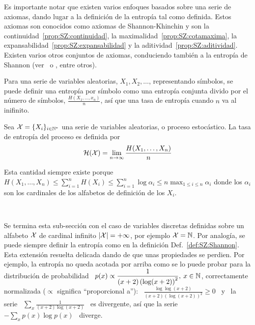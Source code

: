 Es  importante notar  que existen  varios enfoques  basados sobre  una  serie de
axiomas, dando lugar a la definici\'on de la entrop\'ia tal como definida. Estos
axiomas   son   conocidos   como   axiomas   de  Shannon-Khinchin   y   son   la
continuidad~\ref{prop:SZ:continuidad},  la maximalidad~\ref{prop:SZ:cotamaxima},
la           expansabilidad~\ref{prop:SZ:expansabilidad}           y          la
aditividad~\ref{prop:SZ:aditividad}.  Existen varios otros conjuntos de axiomas,
conduciendo  tambi\'en a  la entrop\'ia  de Shannon  (ver~\cite[Sec.~6]{Sha48} o
\cite{ShaWea64, Fad56, Fad58, Khi57, Ren61}, entre otros).

Para  una  serie de  variables  aleatorias,  $X_1,  X_2, \ldots$,  representando
s\'imbolos, se  puede definir una  entrop\'ia por s\'imbolo como  una entrop\'ia
conjunta  divido por el  n\'umero de  s\'imbolos, $\frac{H(X_1,\ldots,x_n)}{n}$,
as\'i que una tasa de entrop\'ia cuando $n$ va al inifinito.
%
\begin{definicion}\label{def:SZ:TasaDeEntropia}
  Sea $\mathcal{X}  = \{  X_i \}_{i \in  \mathbb{N}^*}$ una  serie de variables  aleatorias, o
  proceso estoc\'astico.  La tasa de entrop\'ia del proceso es definida por
  \[
  \mathcal{H}(\mathcal{X}) = \lim_{n \to \infty} \frac{H(X_1,\ldots,X_n)}{n}
  \]
\end{definicion}
%
\noindent Esta  cantidad siempre existe  porque $\displaystyle H(X_1 ,  \ldots ,
X_n) \le \sum_{i=1}^n H(X_i) \le \sum_{i=1}^n  \log \alpha_i \le n \max_{1 \le i
  \le n} \alpha_i$  donde los $\alpha_i$ son los cardinales  de los alfabetos de
definici\'on de los $X_i$.

\

Se termina esta sub-secci\'on con el caso de variables discretas definidas sobre
un  alfabeto $\mathcal{X}$ de  cardinal infinito  $|\mathcal{X}| =  + \infty$,  por ejemplo  $\mathcal{X} =
\mathbb{N}$.   Por analog\'ia,  se puede  siempre definir  la entrop\'ia  como  en la
definici\'on Def.~\ref{def:SZ:Shannon}. Esta extensi\'on resuelta delicada dando
de que unas propiedades se perdien.  Por ejemplo, la entrop\'ia no queda acotada
por arriba  como se  lo puede  probar para la  distribuci\'on de  probabilidad \
$\displaystyle p(x)  \propto \frac{1}{(x+2) \left(  \log (x+2) \right)^2},  \: x
\in \mathbb{N}$, correctamente  normalizada ($\propto$ significa ``proporcional a''):
\ $\displaystyle \frac{\log \log(x+2)}{(x+2) \left( \log (x+2) \right)^2} \ge 0$
\  y  \ la  serie  \  $\displaystyle \sum_x  \frac{1}{(x+2)  \log  (x+2)}$ \  es
divergente,  as\'i que  la serie  \ $\displaystyle  - \sum_x  p(x) \log  p(x)$ \
diverge.

